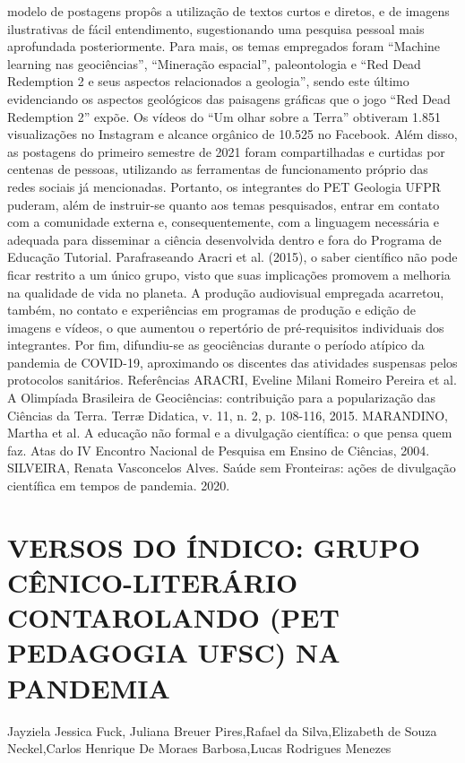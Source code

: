 modelo de postagens propôs a utilização de textos curtos e diretos, e de imagens ilustrativas de
fácil entendimento, sugestionando uma pesquisa pessoal mais aprofundada posteriormente. Para
mais, os temas empregados foram “Machine learning nas geociências”, “Mineração espacial”,
paleontologia e “Red Dead Redemption 2 e seus aspectos relacionados a geologia”, sendo este
último evidenciando os aspectos geológicos das paisagens gráficas que o jogo “Red Dead
Redemption 2” expõe. Os vídeos do “Um olhar sobre a Terra” obtiveram 1.851 visualizações no
Instagram e alcance orgânico de 10.525 no Facebook. Além disso, as postagens do primeiro
semestre de 2021 foram compartilhadas e curtidas por centenas de pessoas, utilizando as
ferramentas de funcionamento próprio das redes sociais já mencionadas. Portanto, os integrantes
do PET Geologia UFPR puderam, além de instruir-se quanto aos temas pesquisados, entrar em
contato com a comunidade externa e, consequentemente, com a linguagem necessária e
adequada para disseminar a ciência desenvolvida dentro e fora do Programa de Educação
Tutorial. Parafraseando Aracri et al. (2015), o saber científico não pode ficar restrito a um único
grupo, visto que suas implicações promovem a melhoria na qualidade de vida no planeta. A
produção audiovisual empregada acarretou, também, no contato e experiências em programas de
produção e edição de imagens e vídeos, o que aumentou o repertório de pré-requisitos
individuais dos integrantes. Por fim, difundiu-se as geociências durante o período atípico da
pandemia de COVID-19, aproximando os discentes das atividades suspensas pelos protocolos
sanitários.
Referências
ARACRI, Eveline Milani Romeiro Pereira et al. A Olimpíada Brasileira de Geociências:
contribuição para a popularização das Ciências da Terra. Terræ Didatica, v. 11, n. 2, p. 108-116,
2015.
MARANDINO, Martha et al. A educação não formal e a divulgação científica: o que pensa
quem faz. Atas do IV Encontro Nacional de Pesquisa em Ensino de Ciências, 2004.
SILVEIRA, Renata Vasconcelos Alves. Saúde sem Fronteiras: ações de divulgação científica
em tempos de pandemia. 2020.



\section{VERSOS DO ÍNDICO: GRUPO CÊNICO-LITERÁRIO CONTAROLANDO (PET  PEDAGOGIA UFSC) NA PANDEMIA}

Jayziela Jessica Fuck, Juliana Breuer Pires,Rafael da Silva,Elizabeth de  Souza Neckel,Carlos Henrique De Moraes Barbosa,Lucas Rodrigues Menezes

